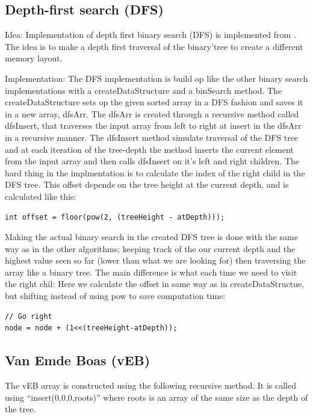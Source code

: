 \subsection{Depth-first search (DFS)}
Idea:
Implementation of depth first binary search (DFS) is implemented from \citep{binAlg}. The idea is to make a depth first traversal of the binary'tree to create a different memory layout. 

Implementation:
The DFS implementation is build op like the other binary search implementations with a createDataStructure and a binSearch 
method. The createDataStructure sets op the given sorted array in a DFS fashion and saves it in a new array, dfsArr. 
The dfsArr is created through a recursive method called dfsInsert, that traverses the input array from left to right at insert in the dfsArr in a recursive manner. The dfsInsert method simulate traversal of the DFS tree and at each iteration of the tree-depth the method inserts the current element from the input array and then calls dfsInsert on it's left and right children. The hard thing in the implmentation is to calculate the index of the right child in the DFS tree. This offset depends on the tree height at the current depth, and is calculated like this:
\begin{verbatim}
int offset = floor(pow(2, (treeHeight - atDepth)));
\end{verbatim}

Making the actual binary search in the created DFS tree is done with the same way as in the other algorithms; keeping track of the our current depth and the highest value seen so far (lower than what we are looking for) then traversing the array like a binary tree. The main difference is what each time we need to visit the right chil: Here we calculate the offset in same way as in createDataStructue, but shifting instead of using pow to save computation time:
\begin{verbatim}
// Go right
node = node + (1<<(treeHeight-atDepth));
\end{verbatim}



\subsection{Van Emde Boas (vEB)}

The vEB array is constructed using the following recursive method. It is called using ``insert(0,0,0,roots)'' where roots is an array of the same size as the depth of the tree.

